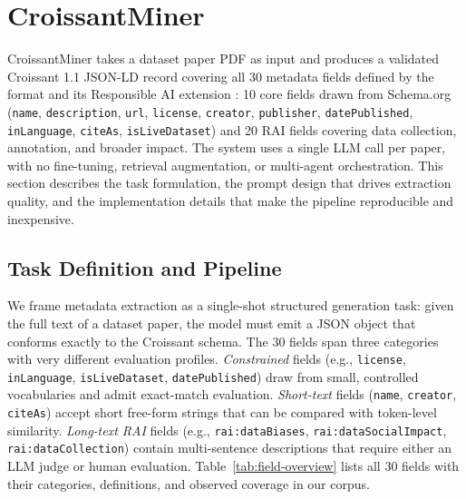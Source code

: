 \section{CroissantMiner}
\label{sec:croissantminer}

CroissantMiner takes a dataset paper PDF as input and produces a validated Croissant 1.1 \cite{akhtar2024croissant} JSON-LD record covering all 30 metadata fields defined by the format and its Responsible AI extension \cite{akhtar2024croissantrai}: 10 core fields drawn from Schema.org \cite{guha2016schema} (\texttt{name}, \texttt{description}, \texttt{url}, \texttt{license}, \texttt{creator}, \texttt{publisher}, \texttt{datePublished}, \texttt{inLanguage}, \texttt{citeAs}, \texttt{isLiveDataset}) and 20 RAI fields covering data collection, annotation, and broader impact. The system uses a single LLM call per paper, with no fine-tuning, retrieval augmentation, or multi-agent orchestration. This section describes the task formulation, the prompt design that drives extraction quality, and the implementation details that make the pipeline reproducible and inexpensive.

\subsection{Task Definition and Pipeline}
\label{sec:task-pipeline}

We frame metadata extraction as a single-shot structured generation task: given the full text of a dataset paper, the model must emit a JSON object that conforms exactly to the Croissant schema. The 30 fields span three categories with very different evaluation profiles. \emph{Constrained} fields (e.g., \texttt{license}, \texttt{inLanguage}, \texttt{isLiveDataset}, \texttt{datePublished}) draw from small, controlled vocabularies and admit exact-match evaluation. \emph{Short-text} fields (\texttt{name}, \texttt{creator}, \texttt{citeAs}) accept short free-form strings that can be compared with token-level similarity. \emph{Long-text RAI} fields (e.g., \texttt{rai:dataBiases}, \texttt{rai:dataSocialImpact}, \texttt{rai:dataCollection}) contain multi-sentence descriptions that require either an LLM judge or human evaluation. Table~\ref{tab:field-overview} lists all 30 fields with their categories, definitions, and observed coverage in our corpus.

